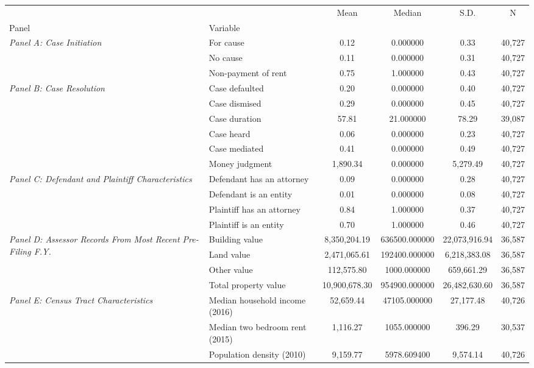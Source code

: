\begin{tabular}{llcccc}
\toprule
 &  & Mean & Median & S.D. & N \\
Panel & Variable &  &  &  &  \\
\midrule
\multirow[c]{3}{4cm}{\textit{Panel A: Case Initiation}} & For cause & 0.12 & 0.000000 & 0.33 & 40,727 \\
 & No cause & 0.11 & 0.000000 & 0.31 & 40,727 \\
 & Non-payment of rent & 0.75 & 1.000000 & 0.43 & 40,727 \\
\cline{1-6}
\multirow[c]{6}{4cm}{\textit{Panel B: Case Resolution}} & Case defaulted & 0.20 & 0.000000 & 0.40 & 40,727 \\
 & Case dismised & 0.29 & 0.000000 & 0.45 & 40,727 \\
 & Case duration & 57.81 & 21.000000 & 78.29 & 39,087 \\
 & Case heard & 0.06 & 0.000000 & 0.23 & 40,727 \\
 & Case mediated & 0.41 & 0.000000 & 0.49 & 40,727 \\
 & Money judgment & 1,890.34 & 0.000000 & 5,279.49 & 40,727 \\
\cline{1-6}
\multirow[c]{4}{4cm}{\textit{Panel C: Defendant and Plaintiff Characteristics}} & Defendant has an attorney & 0.09 & 0.000000 & 0.28 & 40,727 \\
 & Defendant is an entity & 0.01 & 0.000000 & 0.08 & 40,727 \\
 & Plaintiff has an attorney & 0.84 & 1.000000 & 0.37 & 40,727 \\
 & Plaintiff is an entity & 0.70 & 1.000000 & 0.46 & 40,727 \\
\cline{1-6}
\multirow[c]{4}{4cm}{\textit{Panel D: Assessor Records From Most Recent Pre-Filing F.Y.}} & Building value & 8,350,204.19 & 636500.000000 & 22,073,916.94 & 36,587 \\
 & Land value & 2,471,065.61 & 192400.000000 & 6,218,383.08 & 36,587 \\
 & Other value & 112,575.80 & 1000.000000 & 659,661.29 & 36,587 \\
 & Total property value & 10,900,678.30 & 954900.000000 & 26,482,630.60 & 36,587 \\
\cline{1-6}
\multirow[c]{4}{4cm}{\textit{Panel E: Census Tract Characteristics}} & Median household income (2016) & 52,659.44 & 47105.000000 & 27,177.48 & 40,726 \\
 & Median two bedroom rent (2015) & 1,116.27 & 1055.000000 & 396.29 & 30,537 \\
 & Population density (2010) & 9,159.77 & 5978.609400 & 9,574.14 & 40,726 \\

\end{tabular}
